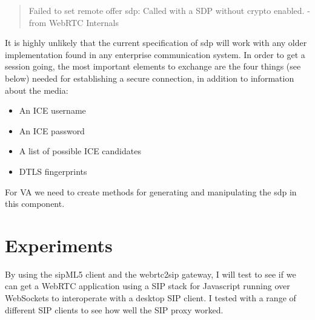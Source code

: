 \begin{quote}
Failed to set remote offer sdp: Called with a SDP without crypto enabled. -from WebRTC Internals
\end{quote}

It is highly unlikely that the current specification of \gls{sdp} will work with any older implementation found in any enterprise communication system. In order to get a session going, the most important elements to exchange are the four things (see below) needed for establishing a secure connection, in addition to information about the media:

\begin{itemize}
\item{An ICE username}
\item{An ICE password}
\item{A list of possible ICE candidates}
\item{DTLS fingerprint}s
\end{itemize}

For VA we need to create methods for generating and manipulating the \gls{sdp} in this component.

\section{Experiments}
By using the sipML5 client and the webrtc2sip gateway, I will test to see if we can get a WebRTC application using a SIP stack for Javascript running over WebSockets to interoperate with a desktop SIP client. I tested with a range of different SIP clients to see how well the SIP proxy worked.

